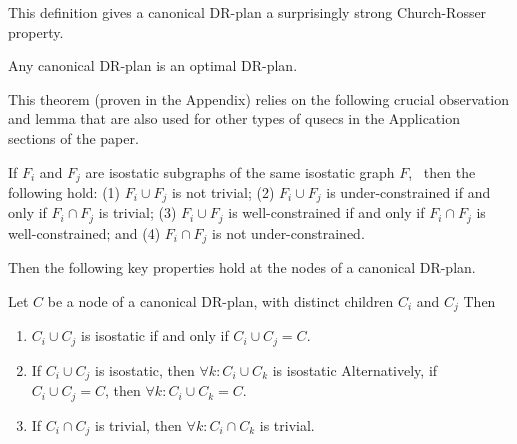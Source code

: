 This definition gives a canonical DR-plan  a surprisingly strong Church-Rosser property.

\begin{theorem} \label{theorem:canonical_is_optimal}
    \label{theorem:main}
    Any canonical DR-plan is an optimal DR-plan.
\end{theorem}




This theorem (proven in the Appendix) relies on the following crucial observation and lemma
that are also used for other types of qusecs in the Application sections of
the paper.

\begin{observation}\label{lemma:union_intersection}
If $F_i$ and $F_j$ are isostatic subgraphs of the same
isostatic graph $F$, \
then the following hold:
(1) $F_i\cup F_j$ is not trivial;
(2) $F_i\cup F_j$ is under-constrained if and only if $F_i\cap F_j$ is trivial;
(3) $F_i\cup F_j$ is well-constrained if and only if $F_i\cap F_j$ is well-constrained; and
(4) $F_i\cap F_j$ is not under-constrained.
\end{observation}

Then the following key properties hold at the nodes of a canonical DR-plan.

\begin{lemma}
Let $C$ be a node of a canonical DR-plan, with distinct children $C_i$ and $C_j$
Then
\begin{enumerate}
    \item
    \label{lemma:wc_intersection_is_C}
$C_i\cup C_j$ is isostatic if and only if $C_i\cup C_j = C$.
\item
    \label{lemma:wc_intersection_makes_all_wc}
If $C_i\cup C_j$ is isostatic, then $\forall k: C_i\cup C_k$ is isostatic
Alternatively, if $C_i\cup C_j=C$, then $\forall k: C_i\cup C_k=C$.
\item
    \label{lemma:uc_intersection_makes_all_uc}
If $C_i\cap C_j$ is trivial, then $\forall k: C_i\cap C_k$ is trivial.
\end{enumerate}
\end{lemma}

